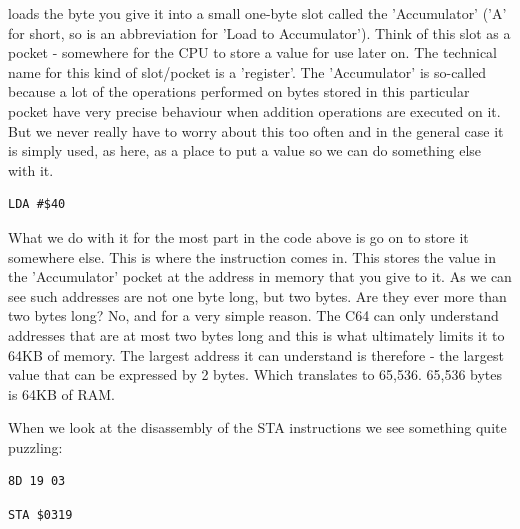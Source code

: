  loads the byte you give it into a small one-byte slot called the 'Accumulator' ('A' for short,
so  is an abbreviation for 'Load to Accumulator'). Think of this slot
as a pocket - somewhere for the CPU to store a value for use later on. The technical name for this kind of 
slot/pocket is a 'register'. The 'Accumulator' is so-called because a lot of the operations performed on
bytes stored in this particular pocket have very precise behaviour when addition operations are executed on
it. But we never really have to worry about this too often and in the general case it is simply used, as
here, as a place to put a value so we can do something else with it.
\clearpage

\begin{lstlisting}[caption=Loading the byte \$40 to the \icode{Accumulator}.,escapechar=\%]
LDA #$40
\end{lstlisting}

What we do with it for the most part in the code above is go on to store it somewhere else. This is where
the  instruction comes in. This stores the value in the 'Accumulator' pocket at the address
in memory that you give to it. As we can see such addresses are not one byte long, but two bytes. Are they
ever more than two bytes long? No, and for a very simple reason. The C64 can only understand addresses
that are at most two bytes long and this is what ultimately limits it to 64KB of memory. The largest address it can understand
is therefore  - the largest value that can be expressed by 2 bytes. Which translates to 65,536.
65,536 bytes is 64KB of RAM. 

When we look at the disassembly of the STA instructions we see something quite puzzling:

\begin{minipage}[b]{0.45\linewidth}
\centering
\begin{lstlisting}[escapechar=\%]
8D 19 03
\end{lstlisting}
\end{minipage}
\hspace{0.5cm}
\begin{minipage}[b]{0.45\linewidth}
\centering
\begin{lstlisting}[escapechar=\%]
STA $0319
\end{lstlisting}
\end{minipage}

